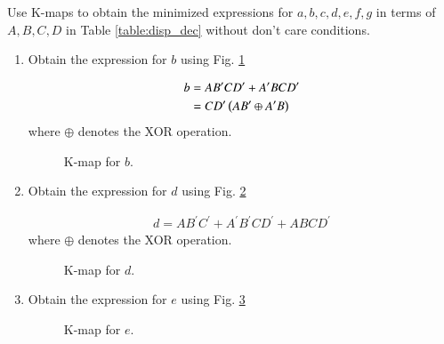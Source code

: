 Use K-maps to obtain the minimized expressions for 
$a,b,c,d,e,f,g$ in terms of $A,B,C,D$ in Table \ref{table:disp_dec} 
without don't care conditions.

\renewcommand{\theequation}{\theenumi}
\renewcommand{\thefigure}{\theenumi}
\begin{enumerate}[label=\thesubsection.\arabic*.,ref=\thesubsection.\theenumi]

\item Obtain the expression for $b$ using Fig. \ref{fig:disp_kmap_b}


\solution

\begin{align}
\label{eq:kmap_disp_b}
b &= A B^{\prime}C D^{\prime} + A^{\prime}B C D^{\prime}
\\
&=C D^{\prime}\left(A B^{\prime} \oplus A^{\prime}B\right)
\end{align}
%
where $\oplus$ denotes the XOR operation.
\begin{figure}[!ht]
\centering
\resizebox{\columnwidth}{!} {

}
\caption{K-map for $b$.}
\label{fig:disp_kmap_b}
\end{figure}
%
\item Obtain the expression for $d$ using Fig. \ref{fig:disp_kmap_d}
\solution


\begin{align}
\label{eq:kmap_disp_d}
d=AB^{\prime}C^{\prime}+A^{\prime}B^{\prime}CD^{\prime}+ABCD^{\prime}
\end{align}
%
where $\oplus$ denotes the XOR operation.
\begin{figure}[!ht]
\centering
\resizebox{\columnwidth}{!} {

}
\caption{K-map for $d$.}
\label{fig:disp_kmap_d}
\end{figure}
\item Obtain the expression for $e$ using Fig. \ref{fig:disp_kmap_e}
%
%
\begin{figure}[!ht]
\centering
\resizebox{\columnwidth}{!} {

}
\caption{K-map for $e$.}
\label{fig:disp_kmap_e}
\end{figure}

%
\end{enumerate}
%
%
